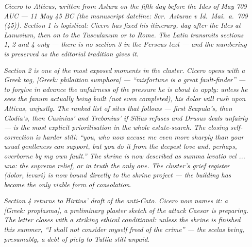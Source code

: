 
\textit{Cicero to Atticus, written from Astura on the
fifth day before the Ides of May 709 AUC --- 11 May
45 BC (the manuscript dateline: \textit{Scr.\ Asturae
v Id.\ Mai.\ a.\ 709 (45)}). Section 1 is logistical:
Cicero has fixed his itinerary, day after the Ides at
Lanuvium, then on to the Tusculanum or to Rome. The
Latin transmits sections 1, 2 and 4 only --- there is
no section 3 in the Perseus text --- and the
numbering is preserved as the editorial tradition
gives it.}

\textit{Section 2 is one of the most exposed moments in
the cluster. Cicero opens with a Greek tag,
\textit{[Greek: philaition sumphora]} ---
``misfortune is a great fault-finder'' --- to forgive
in advance the unfairness of the pressure he is about
to apply: unless he sees the \textit{fanum} actually
being built (not even completed), his
\textit{dolor} will rush upon Atticus, unjustly. The
ranked list of sites that follows --- first
Scapula's, then Clodia's, then Cusinius' and
Trebonius' if Silius refuses and Drusus deals
unfairly --- is the most explicit prioritisation in
the whole estate-search. The closing self-correction
is harder still: ``you, who now accuse me even more
sharply than your usual gentleness can support, but
you do it from the deepest love and, perhaps,
overborne by my own fault.'' The shrine is now
described as \textit{summa levatio vel ... una}: the
supreme relief, or in truth the only one. The
cluster's grief register (\textit{dolor},
\textit{levari}) is now bound directly to the shrine
project --- the building has become the only viable
form of consolation.}

\textit{Section 4 returns to Hirtius' draft of the
anti-Cato. Cicero now names it: a \textit{[Greek:
proplasma]}, a preliminary plaster sketch of the
attack Caesar is preparing. The letter closes with a
striking ethical conditional: unless the shrine is
finished this summer, ``I shall not consider myself
freed of the crime'' --- the \textit{scelus} being,
presumably, a debt of piety to Tullia still unpaid.}
